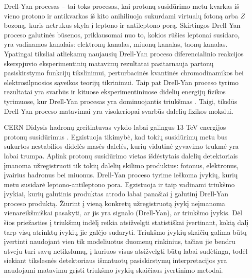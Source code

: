 \documentclass[a4paper, 12pt, oneside]{article}
\begin{document}
Drell-Yan procesas \cite{DYoriginal} -- tai toks procesas, kai protonų susidūrimo metu kvarkas iš vieno protono ir antikvarkas
iš kito anihiliuoja sukurdami virtualų fotoną arba $Z$ bozoną, kuris netrukus skyla į leptono ir antileptono porą.
Skirtingos Drell-Yan proceso galutinės būsenos, priklausomai nuo to, kokios rūšies leptonai susidaro, yra
vadinamos kanalais: elektronų kanalas, miuonų kanalas, taonų kanalas.
Ypatingai tiksliai atliekamų naujausių Drell-Yan proceso diferencialinio reakcijos skerspjūvio eksperimentinių matavimų
rezultatai \cite{DY2015, DY2018} pasitarnauja partonų pasiskirstymo funkcijų tikslinimui, perturbacinės kvantinės chromodinamikos bei
elektrosilpnosios sąveikos teorijų tikrinimui.
Taip pat Drell-Yan proceso tyrimo rezultatai yra svarbūs ir kituose eksperimentiniuose didelių energijų fizikos
tyrimuose, kur Drell-Yan procesas yra dominuojantis triukšmas \cite{Higgs2018, Zprime, SUSYtau}.
Taigi, tikslūs Drell-Yan proceso matavimai yra visokeriopai svarbūs dalelių fizikos mokslui.

CERN Didysis hadronų greitintuvas vykdo labai galingus $13$ TeV energijos protonų susidūrimus \cite{DY2018}.
Egzistuoja tikimybė, kad tokių susidūrimų metu bus sukurtos nestabilios didelės masės dalelės,
kurių vidutinė gyvavimo trukmė yra labai trumpa.
Aplink protonų susidūrimo vietas išdėstytais dalelių detektoriais įmanoma užregistruoti tik tokių
dalelių skilimo produktus: fotonus, elektronus, įvairius hadronus bei miuonus.
Drell-Yan proceso tyrime ieškoma įvykių, kurių metu susidarė leptono-antileptono pora.
Egzistuoja ir taip vadinami triukšmo įvykiai, kurių galutinis produktas atrodo labai panašiai
į galutinį Drell-Yan proceso produktą.
Žiūrint į vieną konkretų užregistruotą įvykį neįmanoma vienareikšmiškai pasakyti, ar jis yra signalo
(Drell-Yan), ar triukšmo įvykis.
Dėl šios priežasties į triukšmų indėlį reikia atsižvelgti statistiškai įvertinant,
kokią dalį tarp visų atrinktų įvykių jie galėjo sudaryti.
Triukšmo įvykių skaičių galima būtų įvertinti naudojant vien tik modeliuotus duomenų rinkinius, tačiau jie bendru atveju turi
savų netikslumų, į kuriuos visus atsižvelgti būtų labai sudėtinga, todėl siekiant tikslesnės detektoriaus išmatuotų pasiskirstymų
interpretacijos yra naudojami matavimu grįsti triukšmo įvykių skaičiaus įvertinimo metodai.
\end{document}
